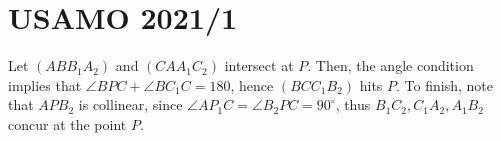 \documentclass[11pt]{scrartcl}
\begin{document}
\section{USAMO 2021/1}
Let $(ABB_1A_2)$ and $(CAA_1C_2)$ intersect at $P$. Then, the angle condition implies that $\angle BPC + \angle BC_1C = 180$, hence $(BCC_1B_2)$ hits $P$. To finish, note that $APB_2$ is collinear, since $\angle AP_1C = \angle B_2PC = 90^\circ$, thus $B_1C_2, C_1A_2, A_1B_2$ concur at the point $P$. 
\end{document}
